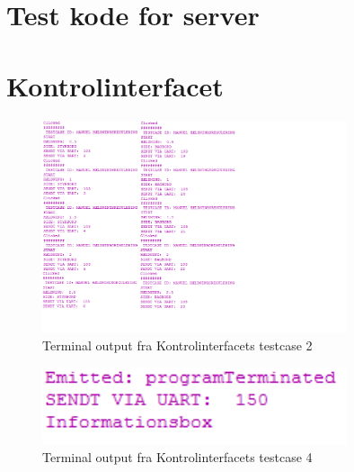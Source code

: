 \section{Test kode for server}
\texttt{}

\section{Kontrolinterfacet}
\texttt{}
\label{test_KI_kode}
	
\begin{figure}[H]
\centering
\includegraphics[width = 0.8\textwidth]{billeder/manuelhaeldning}
\caption{Terminal output fra Kontrolinterfacets testcase 2}
\label{fig:manuelhaeldning}
\end{figure}

\begin{figure}[H]
\centering
\includegraphics[width = 0.8\textwidth]{billeder/termineringsfail}
\caption{Terminal output fra Kontrolinterfacets testcase 4}
\label{fig:terminering}
\end{figure}

